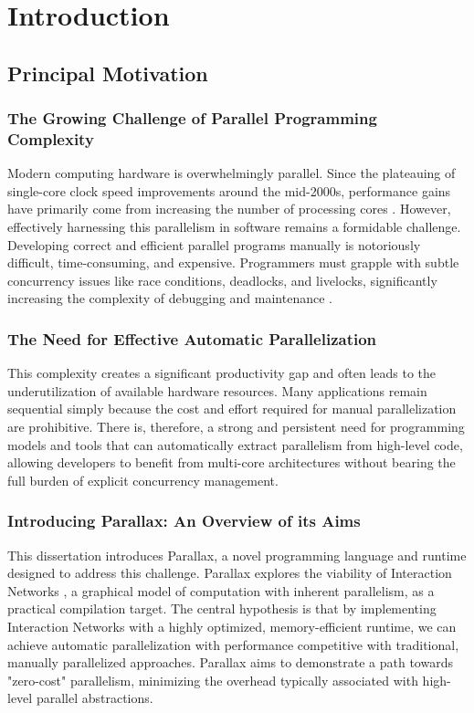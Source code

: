 \chapter{Introduction}

\section{Principal Motivation}

\subsection{The Growing Challenge of Parallel Programming Complexity}
Modern computing hardware is overwhelmingly parallel. Since the plateauing of single-core clock speed improvements around the mid-2000s, performance gains have primarily come from increasing the number of processing cores \cite{Asanovic2006TheLandscape}. However, effectively harnessing this parallelism in software remains a formidable challenge. Developing correct and efficient parallel programs manually is notoriously difficult, time-consuming, and expensive. Programmers must grapple with subtle concurrency issues like race conditions, deadlocks, and livelocks, significantly increasing the complexity of debugging and maintenance \cite{Lee2006TheProblem}.

\subsection{The Need for Effective Automatic Parallelization}
This complexity creates a significant productivity gap and often leads to the underutilization of available hardware resources. Many applications remain sequential simply because the cost and effort required for manual parallelization are prohibitive. There is, therefore, a strong and persistent need for programming models and tools that can automatically extract parallelism from high-level code, allowing developers to benefit from multi-core architectures without bearing the full burden of explicit concurrency management.

\subsection{Introducing Parallax: An Overview of its Aims}
This dissertation introduces Parallax, a novel programming language and runtime designed to address this challenge. Parallax explores the viability of Interaction Networks \cite{Lafont1990InteractionNets}, a graphical model of computation with inherent parallelism, as a practical compilation target. The central hypothesis is that by implementing Interaction Networks with a highly optimized, memory-efficient runtime, we can achieve automatic parallelization with performance competitive with traditional, manually parallelized approaches. Parallax aims to demonstrate a path towards "zero-cost" parallelism, minimizing the overhead typically associated with high-level parallel abstractions.

